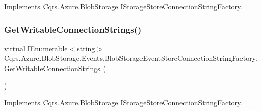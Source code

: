 Implements \hyperlink{interfaceCqrs_1_1Azure_1_1BlobStorage_1_1IStorageStoreConnectionStringFactory_a0ed836289e048767f753630bbcc98d5d_a0ed836289e048767f753630bbcc98d5d}{Cqrs.\+Azure.\+Blob\+Storage.\+I\+Storage\+Store\+Connection\+String\+Factory}.

\mbox{\label{classCqrs_1_1Azure_1_1BlobStorage_1_1Events_1_1BlobStorageEventStoreConnectionStringFactory_a002b45d6a893b1b3024b0e7c97f1c9ac_a002b45d6a893b1b3024b0e7c97f1c9ac}} 
\subsubsection{\texorpdfstring{Get\+Writable\+Connection\+Strings()}{GetWritableConnectionStrings()}}
{\footnotesize\ttfamily virtual I\+Enumerable$<$string$>$ Cqrs.\+Azure.\+Blob\+Storage.\+Events.\+Blob\+Storage\+Event\+Store\+Connection\+String\+Factory.\+Get\+Writable\+Connection\+Strings (\begin{DoxyParamCaption}{ }\end{DoxyParamCaption})\hspace{0.3cm}{\ttfamily [virtual]}}



Implements \hyperlink{interfaceCqrs_1_1Azure_1_1BlobStorage_1_1IStorageStoreConnectionStringFactory_a26ecfd0805fe3d525e9fa419330bd140_a26ecfd0805fe3d525e9fa419330bd140}{Cqrs.\+Azure.\+Blob\+Storage.\+I\+Storage\+Store\+Connection\+String\+Factory}.



